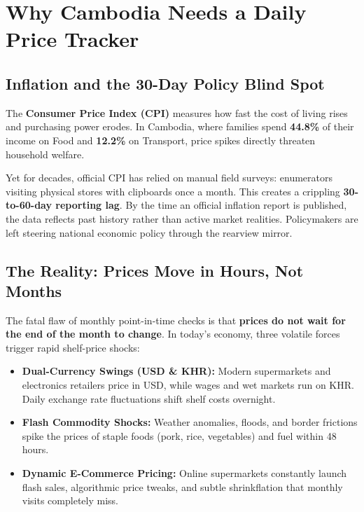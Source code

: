 \documentclass[11pt,a4paper,oneside]{article}
\begin{document}
\newpage


\section{Why Cambodia Needs a Daily Price Tracker}

\subsection{Inflation and the 30-Day Policy Blind Spot}
The \textbf{Consumer Price Index (CPI)} measures how fast the cost of living rises and purchasing power erodes. In Cambodia, where families spend \textbf{44.8\%} of their income on Food and \textbf{12.2\%} on Transport, price spikes directly threaten household welfare.

Yet for decades, official CPI has relied on manual field surveys: enumerators visiting physical stores with clipboards once a month. This creates a crippling \textbf{30-to-60-day reporting lag}. By the time an official inflation report is published, the data reflects past history rather than active market realities. Policymakers are left steering national economic policy through the rearview mirror.

\subsection{The Reality: Prices Move in Hours, Not Months}
The fatal flaw of monthly point-in-time checks is that \textbf{prices do not wait for the end of the month to change}. In today's economy, three volatile forces trigger rapid shelf-price shocks:
\begin{itemize}
    \item \textbf{Dual-Currency Swings (USD \& KHR):} Modern supermarkets and electronics retailers price in USD, while wages and wet markets run on KHR. Daily exchange rate fluctuations shift shelf costs overnight.
    \item \textbf{Flash Commodity Shocks:} Weather anomalies, floods, and border frictions spike the prices of staple foods (pork, rice, vegetables) and fuel within 48 hours.
    \item \textbf{Dynamic E-Commerce Pricing:} Online supermarkets constantly launch flash sales, algorithmic price tweaks, and subtle shrinkflation that monthly visits completely miss.
\end{itemize}
\end{document}
